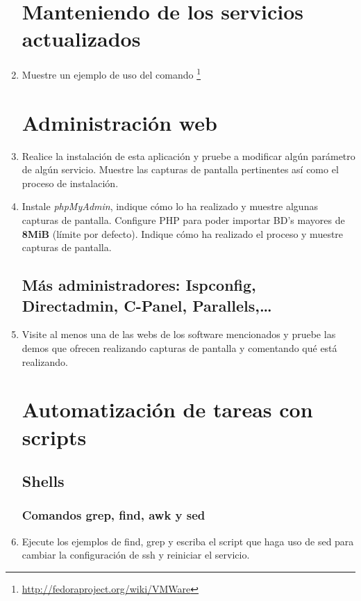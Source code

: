 \documentclass[paper=a4, fontsize=11pt]{scrartcl} %
\numberwithin{equation}{section} %
\numberwithin{figure}{section} %
\numberwithin{table}{section} %
\begin{document}
\begin{enumerate}
	\section{Manteniendo de los servicios actualizados}
	\item Muestre un ejemplo de uso del comando \footnote{\url{http://fedoraproject.org/wiki/VMWare}}
	
	\section{Administración web}
	\item Realice la instalación de esta aplicación y pruebe a modificar algún parámetro de algún
	servicio. Muestre las capturas de pantalla pertinentes así como el proceso de instalación.
	
	\item Instale \textit{phpMyAdmin}, indique cómo lo ha realizado y muestre algunas capturas de
	pantalla. Configure PHP para poder importar BD's mayores de \textbf{8MiB} (límite por defecto).
	Indique cómo ha realizado el proceso y muestre capturas de pantalla.
	
	\subsection{Más administradores: Ispconfig, Directadmin, C-Panel, Parallels,\dots}
	\item Visite al menos una de las webs de los software mencionados y pruebe las demos que ofrecen
	realizando capturas de pantalla y comentando qué está realizando.
	
	\section{Automatización de tareas con scripts}
	\subsection{Shells}
	\subsubsection*{Comandos grep, find, awk y sed}
	\item Ejecute los ejemplos de find, grep y escriba el script que haga uso de sed para cambiar la
	configuración de ssh y reiniciar el servicio.
	

\end{enumerate}
\end{document}
